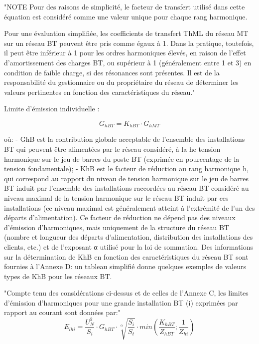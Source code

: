 "NOTE Pour des raisons de simplicité, le facteur de transfert utilisé dans cette équation est considéré comme une valeur unique pour chaque rang harmonique.

Pour une évaluation simplifiée, les coefficients de transfert ThML du réseau MT sur un réseau BT peuvent être pris comme égaux à 1. Dans la pratique, toutefois, il peut être inférieur à 1 pour les ordres harmoniques élevés, en raison de l'effet d'amortissement des charges BT, ou supérieur à 1 (généralement entre 1 et 3) en condition de faible charge, si des résonances sont présentes. Il est de la responsabilité du gestionnaire ou du propriétaire du réseau de déterminer les valeurs pertinentes en fonction des caractéristiques du réseau."


Limite d'émission individuelle :

\begin{equation}
    G_{hBT} = K_{hBT} \cdot G_{hMT}
\end{equation}

où:
- GhB est la contribution globale acceptable de l'ensemble des installations BT qui peuvent être alimentées par le réseau considéré, à la he tension harmonique sur le jeu de barres du poste BT (exprimée en pourcentage de la tension fondamentale);
- KhB est le facteur de réduction au rang harmonique h, qui correspond au rapport du niveau de tension harmonique sur le jeu de barres BT induit par l'ensemble des installations raccordées au réseau BT considéré au niveau maximal de la tension harmonique sur le réseau BT induit par ces installations (ce niveau maximal est généralement atteint à l'extrémité de l'un des départs d'alimentation). Ce facteur de réduction ne dépend pas des niveaux d'émission d'harmoniques, mais uniquement de la structure du réseau BT (nombre et longueur des départs d'alimentation, distribution des installations des clients, etc.) et de l'exposant α utilisé pour la loi de sommation. Des informations sur la détermination de KhB en fonction des caractéristiques du réseau BT sont fournies à l'Annexe D: un tableau simplifié donne quelques exemples de valeurs types de KhB pour les réseaux BT.


"Compte tenu des considérations ci-dessus et de celles de l'Annexe C, les limites d'émission d'harmoniques pour une grande installation BT (i) exprimées par rapport au courant sont données par:"
\begin{equation}
    E_{lhi} = \frac{U_N^2}{S_i} \cdot G_{hBT} \cdot \sqrt[\alpha]{\frac{S_i}{S_t}} \cdot min(\frac{K_{hBT}}{Z_{hBT}};\frac{1}{Z_{hi}})
\end{equation}

